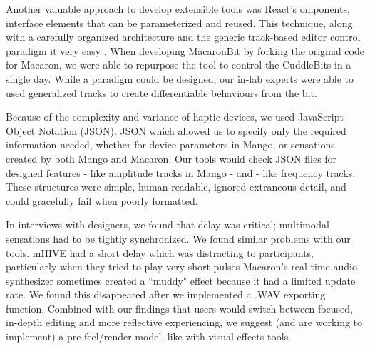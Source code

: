 Another valuable approach to develop extensible tools was React's omponents, interface elements that can be parameterized and reused.
This technique, along with a carefully organized architecture and the generic track-based editor control paradigm it very easy .
When developing MacaronBit by forking the original code for Macaron, we were able to repurpose the tool to control the CuddleBits in a single day.
While a  paradigm could be designed, our in-lab experts were able to used generalized tracks to create differentiable behaviours from the bit.


Because of the complexity and variance of haptic devices, we 
 used JavaScript Object Notation (JSON).
JSON which allowed us to specify only the required information needed, whether for device parameters in Mango, or sensations created by both Mango and Macaron.
Our tools would check JSON files for designed features - like amplitude tracks in Mango - and  - like frequency tracks.
These structures were simple, human-readable, ignored extraneous detail, and could gracefully fail when poorly formatted.

In interviews with designers, we found that delay was critical; multimodal sensations had to be tightly synchronized.
We found similar problems with our tools.
mHIVE had a short delay which was distracting to participants, particularly when they tried to play very short pulses\osE{;}
Macaron's real-time audio synthesizer sometimes created a ``muddy" effect because it had a limited update rate.
We found this disappeared after we implemented a .WAV exporting function.
Combined with our findings that users would switch between focused, in-depth editing and more reflective experiencing, we suggest (and are working to implement) a pre-feel/render model, like with visual effects tools.

